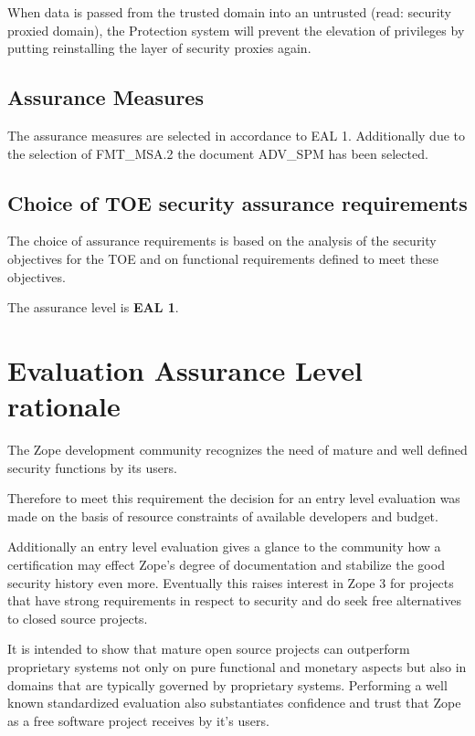 \documentclass[12pt,english]{scrbook}
\begin{document}
When data is passed from the trusted domain into an untrusted (read: security
proxied domain), the Protection system will prevent the elevation of privileges
by putting reinstalling the layer of security proxies again.

\subsection{Assurance Measures}

The assurance measures are selected in accordance to EAL 1. Additionally due to
the selection of FMT\_MSA.2 the document ADV\_SPM has been selected.


\subsection{Choice of TOE security assurance requirements}

The choice of assurance requirements is based on the analysis of the security
objectives for the TOE and on functional requirements defined to meet these
objectives.

The assurance level is \textbf{EAL 1}.



\section{Evaluation Assurance Level rationale}

The Zope development community recognizes the need of mature and well defined
security functions by its users.

Therefore to meet this requirement the decision for an entry level evaluation
was made on the basis of resource constraints of available developers and
budget.

Additionally an entry level evaluation gives a glance to the community how a
certification may effect Zope's degree of documentation and stabilize the good
security history even more. Eventually this raises interest in Zope 3 for
projects that have strong requirements in respect to security and do seek free
alternatives to closed source projects.

It is intended to show that mature open source projects can outperform
proprietary systems not only on pure functional and monetary aspects but also
in domains that are typically governed by proprietary systems. Performing a
well known standardized evaluation also substantiates confidence and trust that
Zope as a free software project receives by it's users.
\end{document}
